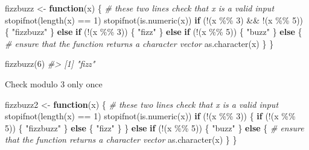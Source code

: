 \documentclass[
]{book}
\newenvironment{Shaded}{\begin{snugshade}}{\end{snugshade}}
\newcommand{\CommentTok}[1]{\textcolor[rgb]{0.56,0.35,0.01}{\textit{#1}}}
\newcommand{\ControlFlowTok}[1]{\textcolor[rgb]{0.13,0.29,0.53}{\textbf{#1}}}
\newcommand{\DecValTok}[1]{\textcolor[rgb]{0.00,0.00,0.81}{#1}}
\newcommand{\FunctionTok}[1]{\textcolor[rgb]{0.00,0.00,0.00}{#1}}
\newcommand{\NormalTok}[1]{#1}
\newcommand{\OtherTok}[1]{\textcolor[rgb]{0.56,0.35,0.01}{#1}}
\newcommand{\SpecialCharTok}[1]{\textcolor[rgb]{0.00,0.00,0.00}{#1}}
\newcommand{\StringTok}[1]{\textcolor[rgb]{0.31,0.60,0.02}{#1}}
\begin{document}
\begin{Shaded}
\begin{Highlighting}[]
\NormalTok{fizzbuzz }\OtherTok{\textless{}{-}} \ControlFlowTok{function}\NormalTok{(x) \{}
  \CommentTok{\# these two lines check that x is a valid input}
  \FunctionTok{stopifnot}\NormalTok{(}\FunctionTok{length}\NormalTok{(x) }\SpecialCharTok{==} \DecValTok{1}\NormalTok{)}
  \FunctionTok{stopifnot}\NormalTok{(}\FunctionTok{is.numeric}\NormalTok{(x))}
  \ControlFlowTok{if}\NormalTok{ (}\SpecialCharTok{!}\NormalTok{(x }\SpecialCharTok{\%\%} \DecValTok{3}\NormalTok{) }\SpecialCharTok{\&\&} \SpecialCharTok{!}\NormalTok{(x }\SpecialCharTok{\%\%} \DecValTok{5}\NormalTok{)) \{}
    \StringTok{"fizzbuzz"}
\NormalTok{  \} }\ControlFlowTok{else} \ControlFlowTok{if}\NormalTok{ (}\SpecialCharTok{!}\NormalTok{(x }\SpecialCharTok{\%\%} \DecValTok{3}\NormalTok{)) \{}
    \StringTok{"fizz"}
\NormalTok{  \} }\ControlFlowTok{else} \ControlFlowTok{if}\NormalTok{ (}\SpecialCharTok{!}\NormalTok{(x }\SpecialCharTok{\%\%} \DecValTok{5}\NormalTok{)) \{}
    \StringTok{"buzz"}
\NormalTok{  \} }\ControlFlowTok{else}\NormalTok{ \{}
    \CommentTok{\# ensure that the function returns a character vector}
    \FunctionTok{as.character}\NormalTok{(x)}
\NormalTok{  \}}
\NormalTok{\}}
\end{Highlighting}
\end{Shaded}

\begin{Shaded}
\begin{Highlighting}[]
\FunctionTok{fizzbuzz}\NormalTok{(}\DecValTok{6}\NormalTok{)}
\CommentTok{\#\textgreater{} [1] "fizz"}
\end{Highlighting}
\end{Shaded}

Check modulo 3 only once

\begin{Shaded}
\begin{Highlighting}[]
\NormalTok{fizzbuzz2 }\OtherTok{\textless{}{-}} \ControlFlowTok{function}\NormalTok{(x) \{}
  \CommentTok{\# these two lines check that x is a valid input}
  \FunctionTok{stopifnot}\NormalTok{(}\FunctionTok{length}\NormalTok{(x) }\SpecialCharTok{==} \DecValTok{1}\NormalTok{)}
  \FunctionTok{stopifnot}\NormalTok{(}\FunctionTok{is.numeric}\NormalTok{(x))}
  \ControlFlowTok{if}\NormalTok{ (}\SpecialCharTok{!}\NormalTok{(x }\SpecialCharTok{\%\%} \DecValTok{3}\NormalTok{)) \{}
    \ControlFlowTok{if}\NormalTok{ (}\SpecialCharTok{!}\NormalTok{(x }\SpecialCharTok{\%\%} \DecValTok{5}\NormalTok{)) \{}
      \StringTok{"fizzbuzz"}
\NormalTok{    \} }\ControlFlowTok{else}\NormalTok{ \{}
      \StringTok{"fizz"}
\NormalTok{    \}}
\NormalTok{  \} }\ControlFlowTok{else} \ControlFlowTok{if}\NormalTok{ (}\SpecialCharTok{!}\NormalTok{(x }\SpecialCharTok{\%\%} \DecValTok{5}\NormalTok{)) \{}
    \StringTok{"buzz"}
\NormalTok{  \} }\ControlFlowTok{else}\NormalTok{ \{}
    \CommentTok{\# ensure that the function returns a character vector}
    \FunctionTok{as.character}\NormalTok{(x)}
\NormalTok{  \}}
\NormalTok{\}}
\end{Highlighting}
\end{Shaded}
\end{document}
